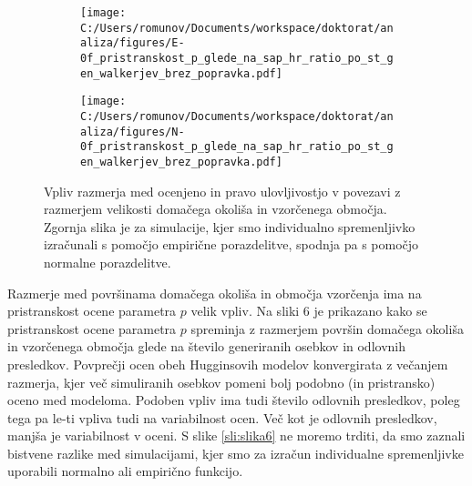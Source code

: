 \begin{figure}[H]
\centering
\begin{subfigure}[b]{1\textwidth}
  \centering
  \texttt{[image: C:/Users/romunov/Documents/workspace/doktorat/analiza/figures/E-0f\_pristranskost\_p\_glede\_na\_sap\_hr\_ratio\_po\_st\_gen\_walkerjev\_brez\_popravka.pdf]}

  \label{sli:sub5.1}
\end{subfigure}

\begin{subfigure}[b]{1\textwidth}
  \centering
  \texttt{[image: C:/Users/romunov/Documents/workspace/doktorat/analiza/figures/N-0f\_pristranskost\_p\_glede\_na\_sap\_hr\_ratio\_po\_st\_gen\_walkerjev\_brez\_popravka.pdf]}
  \label{sli:sub5.2}
\end{subfigure}

\caption[Vpliv razmerja med ocenjeno in pravo ulovljivostjo v povezavi z razmerjem velikosti domačega okoliša in vzorčenega območja.]{Vpliv razmerja med ocenjeno in pravo ulovljivostjo v povezavi z razmerjem velikosti domačega okoliša in vzorčenega območja. Zgornja slika je za simulacije, kjer smo individualno spremenljivko izračunali s pomočjo empirične porazdelitve, spodnja pa s pomočjo normalne porazdelitve.}
\label{sli:slika5}
\end{figure}

Razmerje med površinama domačega okoliša in območja vzorčenja ima na pristranskost ocene parametra $p$ velik vpliv. Na sliki 6 je prikazano kako se pristranskost ocene parametra $p$ spreminja z razmerjem površin domačega okoliša in vzorčenega območja glede na število generiranih osebkov in odlovnih presledkov. Povprečji ocen obeh Hugginsovih modelov konvergirata z večanjem razmerja, kjer več simuliranih osebkov pomeni bolj podobno (in pristransko) oceno med modeloma. Podoben vpliv ima tudi število odlovnih presledkov, poleg tega pa le-ti vpliva tudi na variabilnost ocen. Več kot je odlovnih presledkov, manjša je variabilnost v oceni. S slike \ref{sli:slika6} ne moremo trditi, da smo zaznali bistvene razlike med simulacijami, kjer smo za izračun individualne spremenljivke uporabili normalno ali empirično funkcijo.

